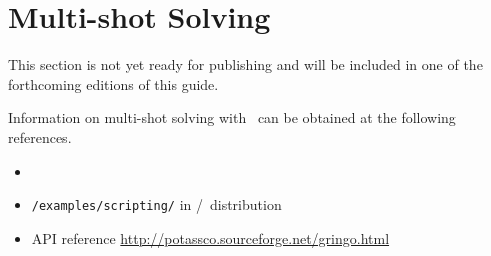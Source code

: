 \section{Multi-shot Solving}\label{sec:multi}

This section is not yet ready for publishing
and will be included in one of the forthcoming editions of this guide.

Information on multi-shot solving with \clingo\ can be obtained at the following references.

\begin{itemize}
\item \cite{gekakasc14b,gekaobsc15a}
\item \texttt{/examples/scripting/} in \gringo/\clingo\ distribution
\item API reference \url{http://potassco.sourceforge.net/gringo.html}
\end{itemize}

